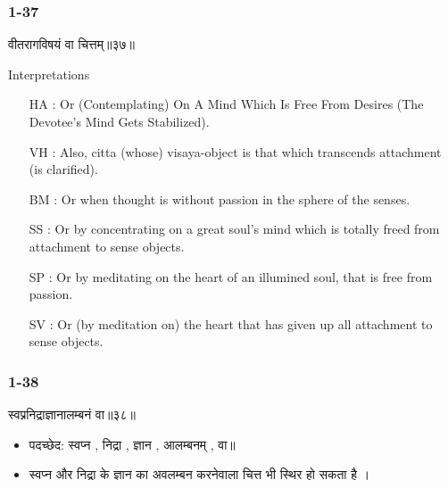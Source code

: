 \begin{frame}[fragile]\frametitle{1-37}
\begin{sanskrit}
वीतरागविषयं वा चित्तम्॥३७॥
\end{sanskrit}

Interpretations
\begin{itemize}	
\item [HA]: Or (Contemplating) On A Mind Which Is Free From Desires (The Devotee’s Mind Gets Stabilized).
\item [VH]: Also, citta (whose) visaya-object is that which transcends attachment (is clarified).
\item [BM]: Or when thought is without passion in the sphere of the senses.
\item [SS]: Or by concentrating on a great soul’s mind which is totally freed from attachment to sense objects.
\item [SP]: Or by meditating on the heart of an illumined soul, that is free from passion.
\item [SV]: Or (by meditation on) the heart that has given up all attachment to sense objects. 
\end{itemize}
	
\end{frame}

\begin{frame}[fragile]\frametitle{1-38}
\begin{sanskrit}
स्वप्ननिद्राज्ञानालम्बनं वा॥३८॥
\end{sanskrit}

\begin{itemize}
\item पदच्छेद: स्वप्न , निद्रा , ज्ञान , आलम्बनम् , वा॥
\item स्वप्न और निद्रा के ज्ञान का अवलम्बन करनेवाला चित्त भी स्थिर हो सकता है ।
\end{itemize}
	
\end{frame}



